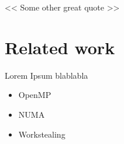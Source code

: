 
\begin{savequote}[6cm]
<< Some other great quote  >>
\end{savequote}
\chapter{Related work}
\chaptertoc

Lorem Ipsum blablabla

\begin{itemize}
  \item OpenMP
  \item NUMA
  \item Workstealing
\end{itemize}



